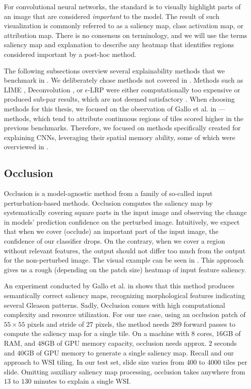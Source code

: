 For convolutional neural networks, the standard is to visually highlight parts of an image that are considered \emph{important} to the model.
The result of such visualization is commonly referred to as a saliency map, class activation map, or attribution map.
There is no consensus on terminology, and we will use the terms saliency map and explanation to describe any heatmap that identifies regions considered important by a post-hoc method.

The following subsections overview several explainability methods that we benchmark in .
We deliberately chose methods not covered in \cite{gallo}.
Methods such as LIME \cite{xai-husky}, Deconvolution \cite{deconvolution}, or $\epsilon$-LRP \cite{lrp}  were either computationally too expensive or produced sub-par results, which are not deemed satisfactory \cite{gallo}.
When choosing methods for this thesis, we focused on the observation of Gallo et al. in \cite{gallo} --- methods, which tend to attribute continuous regions of tiles scored higher in the previous benchmarks.
Therefore, we focused on methods specifically created for explaining CNNs, leveraging their spatial memory ability, some of which were overviewed in \cite{krajnansky-grad-cam, bajger-grad-cam, hruska-grad-cam}.

\subsection{Occlusion}\label{occlusion}

Occlusion is a model-agnostic method from a family of so-called input perturbation-based methods.
Occlusion computes the saliency map by systematically covering square parts in the input image and observing the change in models' prediction confidence on the perturbed image.
Intuitively, we expect that when we cover (occlude) an important part of the input image, the confidence of our classifier drops.
On the contrary, when we cover a region without relevant features, the output should not differ too much from the output for the non-perturbed image.
The visual example can be seen in . This approach gives us a rough (depending on the patch size) heatmap of input feature saliency.

An experiment conducted by Gallo et al. in \cite{gallo} shows that this method produces semantically correct saliency maps, recognizing morphological features indicating several Gleason patterns.
Sadly, Occlusion comes with high computational complexity and resource utilization.
For our use case, using an occlusion patch of $55 \times 55$ pixels and stride of $27$ pixels, the method needs 289 forward passes to compute the saliency map for a single tile.
On a machine with $8$ cores, $16$GB of RAM, and $48$GB of GPU memory capacity, occlusion needs approx. $2$ seconds and $40$GB of GPU memory to generate a single saliency map.
Recall  and our approach to WSI tiling.
In our test set, slide size varies from 400 to 4000 tiles per slide.
Omitting auxiliary saliency map processing, occlusion takes anywhere from $13$ to $130$ minutes to explain a single WSI.

